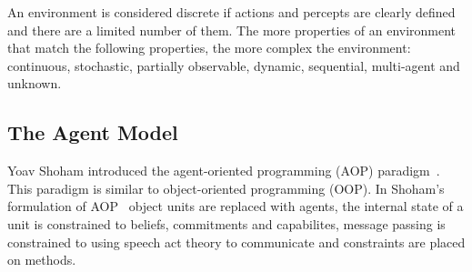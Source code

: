\documentclass[]{final_report}
\begin{document}
An environment is considered discrete if actions and percepts are clearly defined and there are a limited number of them. The more properties of an environment that match the following properties, the more complex the environment: continuous, stochastic, partially observable, dynamic, sequential, multi-agent and unknown.

\subsection{The Agent Model}
Yoav Shoham introduced the agent-oriented programming (AOP) paradigm~\cite{shoham1993agent}. This paradigm is similar to object-oriented programming (OOP). In Shoham's formulation of AOP~\cite{shoham1991agent0} object units are replaced with agents, the internal state of a unit is constrained to beliefs, commitments and capabilites, message passing is constrained to using speech act theory to communicate and constraints are placed on methods.
\end{document}
